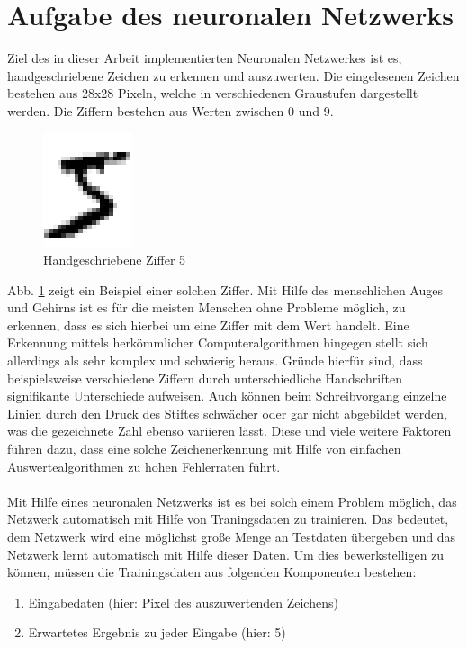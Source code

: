 \section{Aufgabe des neuronalen Netzwerks}
Ziel des in dieser Arbeit implementierten Neuronalen Netzwerkes ist es, handgeschriebene Zeichen zu erkennen und auszuwerten. Die eingelesenen Zeichen bestehen aus 28x28 Pixeln, welche in verschiedenen Graustufen dargestellt werden. Die Ziffern bestehen aus Werten zwischen 0 und 9. 
\begin{figure}[hbt]
	\centering
	\includegraphics[scale=0.6]{Bilder/handdrawn_digit}
	\caption{Handgeschriebene Ziffer 5 \cite{nielson:2017}} 
	\label{fig:handwritten_digit_5} 
\end{figure}
Abb. \ref{fig:handwritten_digit_5} zeigt ein Beispiel einer solchen Ziffer. Mit Hilfe des menschlichen Auges und Gehirns ist es für die meisten Menschen ohne Probleme möglich, zu erkennen, dass es sich hierbei um eine Ziffer mit dem Wert \grqq handelt. Eine Erkennung mittels herkömmlicher Computeralgorithmen hingegen stellt sich allerdings als sehr komplex und schwierig heraus. Gründe hierfür sind, dass beispielsweise verschiedene Ziffern durch unterschiedliche Handschriften signifikante Unterschiede aufweisen. Auch können beim Schreibvorgang einzelne Linien durch den Druck des Stiftes schwächer oder gar nicht abgebildet werden, was die gezeichnete Zahl ebenso variieren lässt. Diese und viele weitere Faktoren führen dazu, dass eine solche Zeichenerkennung mit Hilfe von einfachen Auswertealgorithmen zu hohen Fehlerraten führt. \\ \\
Mit Hilfe eines neuronalen Netzwerks ist es bei solch einem Problem möglich, das Netzwerk automatisch mit Hilfe von Traningsdaten zu trainieren. Das bedeutet, dem Netzwerk wird eine möglichst große Menge an Testdaten übergeben und das Netzwerk lernt automatisch mit Hilfe dieser Daten. Um dies bewerkstelligen zu können, müssen die Trainingsdaten aus folgenden Komponenten bestehen:
\begin{enumerate}
\item Eingabedaten (hier: Pixel des auszuwertenden Zeichens)
\item Erwartetes Ergebnis zu jeder Eingabe (hier: 5)
\end{enumerate}

